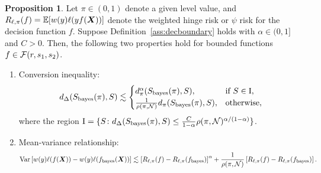 \documentclass[11pt]{article}
\theoremstyle{plain}
\theoremstyle{definition}
\newtheorem{prop}{Proposition}
\def\bayesf{f_{\textup{bayes}}}
\def\bayesS{S_{\textup{bayes}}}
\begin{document}
\begin{prop}\label{prop:equivalance}
Let $\pi\in(0,1)$ denote a given level value, and $R_{\ell,\pi}(f)=\mathbb{E}[w(y)\ell(yf(\bm X))]$ denote the weighted hinge risk  or $\psi$ risk for the decision function $f$. Suppose Definition~\ref{ass:decboundary}
holds with $\alpha\in(0,1]$ and $C>0$. Then, the following two properties hold for bounded functions $f\in\mathcal{F}(r,s_1,s_2)$. 
\begin{enumerate}
\item Conversion inequality:  
\begin{equation}\label{eq:conversion}
d_{\Delta}(\bayesS(\pi),S) \lesssim
\begin{cases}
d^\alpha_{\pi}(\bayesS(\pi),S), & \text{if }S\in \textup{I},\\
{1\over \rho(\pi, \tN)}d_{\pi}(\bayesS(\pi),S),& \text{otherwise},
\end{cases}
\end{equation}
where the region $\textup{I}=\{S \colon d_{\Delta}(\bayesS(\pi),S)\leq \frac	{C}{1-\alpha}\rho(\pi,\tN)^{\alpha/(1-\alpha)}\}$.
\item Mean-variance relationship:
\begin{equation}
\text{Var}\left[w(y)\ell(f(\mX)) - w(y)\ell(\bayesf(\mX))\right]  \lesssim 
\left[R_{\ell,\pi}(f)-R_{\ell,\pi}(\bayesf)\right]^{\alpha}+
 {1\over \rho(\pi, \tN)}\left[R_{\ell,\pi}(f)-R_{\ell,\pi}(\bayesf)\right].
\end{equation}
\end{enumerate}
\end{prop}
\end{document}
